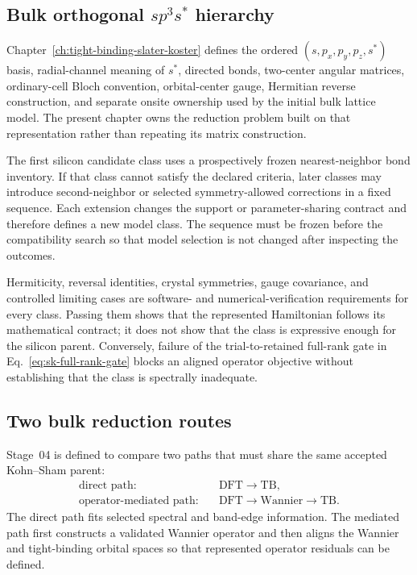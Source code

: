 \subsection{Bulk orthogonal \texorpdfstring{$sp^3s^{\ast}$}{sp3s*} hierarchy}


Chapter~\ref{ch:tight-binding-slater-koster} defines the ordered
$(s,p_x,p_y,p_z,s^{\ast})$ basis, radial-channel meaning of $s^{\ast}$,
directed bonds, two-center angular matrices, ordinary-cell Bloch convention,
orbital-center gauge, Hermitian reverse construction, and separate onsite
ownership used by the initial bulk lattice model. The present chapter owns the
reduction problem built on that representation rather than repeating its
matrix construction.

The first silicon candidate class uses a prospectively frozen nearest-neighbor
bond inventory. If that class cannot satisfy the declared criteria, later classes
may introduce second-neighbor or selected symmetry-allowed corrections in a
fixed sequence. Each extension changes the support or parameter-sharing
contract and therefore defines a new model class. The sequence must be frozen
before the compatibility search so that model selection is not changed after
inspecting the outcomes.

Hermiticity, reversal identities, crystal symmetries, gauge covariance, and
controlled limiting cases are software- and numerical-verification
requirements for every class. Passing them shows that the represented
Hamiltonian follows its mathematical contract; it does not show that the class
is expressive enough for the silicon parent. Conversely, failure of the
trial-to-retained full-rank gate in
Eq.~\eqref{eq:sk-full-rank-gate} blocks an aligned operator objective without
establishing that the class is spectrally inadequate.

\subsection{Two bulk reduction routes}


Stage~04 is defined to compare two paths that must share the same accepted
Kohn--Sham parent:
\begin{align}
  \text{direct path:}\quad
  &\mathrm{DFT}\longrightarrow\mathrm{TB},\\
  \text{operator-mediated path:}\quad
  &\mathrm{DFT}\longrightarrow\mathrm{Wannier}
    \longrightarrow\mathrm{TB}.
\end{align}
The direct path fits selected spectral and band-edge information. The mediated
path first constructs a validated Wannier operator and then aligns the
Wannier and tight-binding orbital spaces so that represented operator residuals
can be defined.

